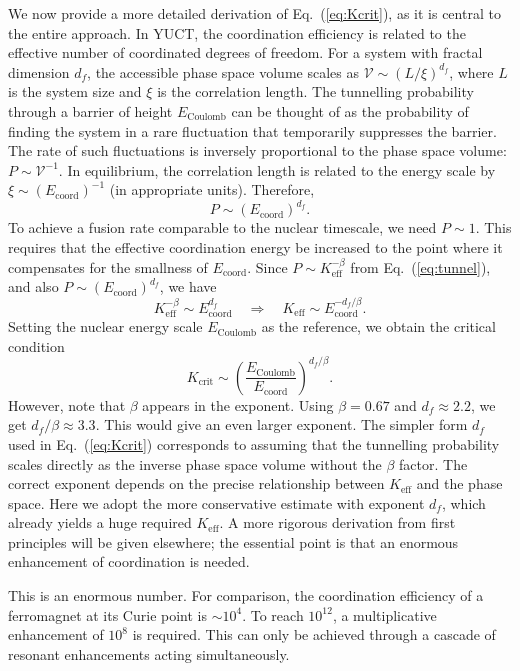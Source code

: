 \documentclass[12pt]{article}
\theoremstyle{remark}
\newcommand{\Keff}{K_{\mathrm{eff}}}
\newcommand{\df}{d_{\!f}}
\newcommand{\Kcrit}{K_{\mathrm{crit}}}
\begin{document}
	We now provide a more detailed derivation of Eq.~(\ref{eq:Kcrit}), as it is central to the entire approach. In YUCT, the coordination efficiency is related to the effective number of coordinated degrees of freedom. For a system with fractal dimension \(\df\), the accessible phase space volume scales as \( \mathcal{V} \sim (L/\xi)^{\df}\), where \(L\) is the system size and \(\xi\) is the correlation length. The tunnelling probability through a barrier of height \(E_{\text{Coulomb}}\) can be thought of as the probability of finding the system in a rare fluctuation that temporarily suppresses the barrier. The rate of such fluctuations is inversely proportional to the phase space volume: \(P \sim \mathcal{V}^{-1}\). In equilibrium, the correlation length is related to the energy scale by \(\xi \sim (E_{\mathrm{coord}})^{-1}\) (in appropriate units). Therefore,
	\[
	P \sim (E_{\mathrm{coord}})^{\df}.
	\]
	To achieve a fusion rate comparable to the nuclear timescale, we need \(P \sim 1\). This requires that the effective coordination energy be increased to the point where it compensates for the smallness of \(E_{\mathrm{coord}}\). Since \(P \sim \Keff^{-\beta}\) from Eq.~(\ref{eq:tunnel}), and also \(P \sim (E_{\mathrm{coord}})^{\df}\), we have
	\[
	\Keff^{-\beta} \sim E_{\mathrm{coord}}^{\df} \quad\Longrightarrow\quad \Keff \sim E_{\mathrm{coord}}^{-\df/\beta}.
	\]
	Setting the nuclear energy scale \(E_{\text{Coulomb}}\) as the reference, we obtain the critical condition
	\[
	\Kcrit \sim \left( \frac{E_{\text{Coulomb}}}{E_{\mathrm{coord}}} \right)^{\df/\beta}.
	\]
	However, note that \(\beta\) appears in the exponent. Using \(\beta = 0.67\) and \(\df \approx 2.2\), we get \(\df/\beta \approx 3.3\). This would give an even larger exponent. The simpler form \(\df\) used in Eq.~(\ref{eq:Kcrit}) corresponds to assuming that the tunnelling probability scales directly as the inverse phase space volume without the \(\beta\) factor. The correct exponent depends on the precise relationship between \(\Keff\) and the phase space. Here we adopt the more conservative estimate with exponent \(\df\), which already yields a huge required \(\Keff\). A more rigorous derivation from first principles will be given elsewhere; the essential point is that an enormous enhancement of coordination is needed.
	
	This is an enormous number. For comparison, the coordination efficiency of a ferromagnet at its Curie point is \(\sim 10^4\). To reach \(10^{12}\), a multiplicative enhancement of \(10^8\) is required. This can only be achieved through a cascade of resonant enhancements acting simultaneously.
	
\end{document}

